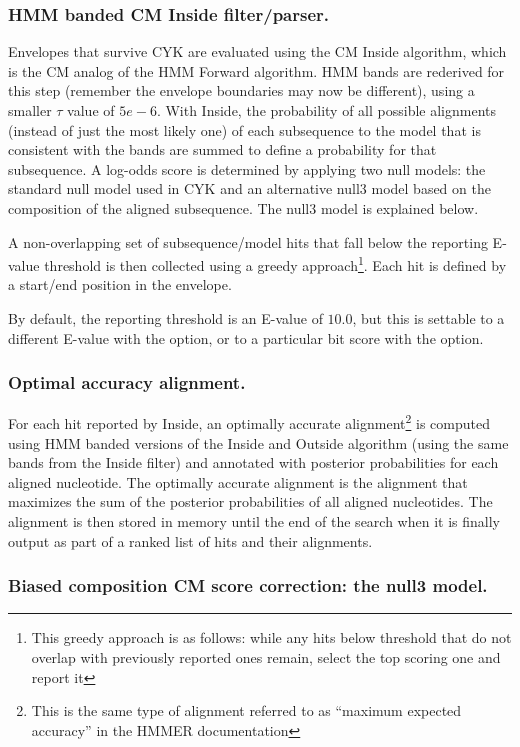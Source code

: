 \subsubsection{HMM banded CM Inside filter/parser.}

Envelopes that survive CYK are evaluated using the CM Inside
algorithm, which is the CM analog of the HMM Forward algorithm. HMM
bands are rederived for this step (remember the envelope boundaries
may now be different), using a smaller $\tau$ value of $5e-6$. With
Inside, the probability of all possible alignments (instead of just
the most likely one) of each subsequence to the model that is
consistent with the bands are summed to define a probability for that
subsequence. A log-odds score is determined by applying two null
models: the standard null model used in CYK and an alternative null3
model based on the composition of the aligned subsequence. The null3
model is explained below.

A non-overlapping set of subsequence/model hits that fall below the
reporting E-value threshold is then collected using a greedy
approach\footnote{This greedy approach is as follows: while any hits
below threshold that do not overlap with previously reported ones
remain, select the top scoring one and report it}. Each hit is defined
by a start/end position in the envelope. 

By default, the reporting threshold is an E-value of $10.0$, but this
is settable to a different E-value with the  option, or
to a particular bit score with the  option.

\subsubsection{Optimal accuracy alignment.}

For each hit reported by Inside, an optimally accurate
alignment\footnote{This is the same type of alignment referred to as
``maximum expected accuracy'' in the HMMER documentation} is computed
using HMM banded versions of the Inside and Outside algorithm (using
the same bands from the Inside filter) and annotated with posterior
probabilities for each aligned nucleotide. The optimally accurate
alignment is the alignment that maximizes the sum of the posterior
probabilities of all aligned nucleotides. The alignment is then stored in
memory until the end of the search when it is finally output as part
of a ranked list of hits and their alignments.

\subsubsection{Biased composition CM score correction: the null3 model.}

